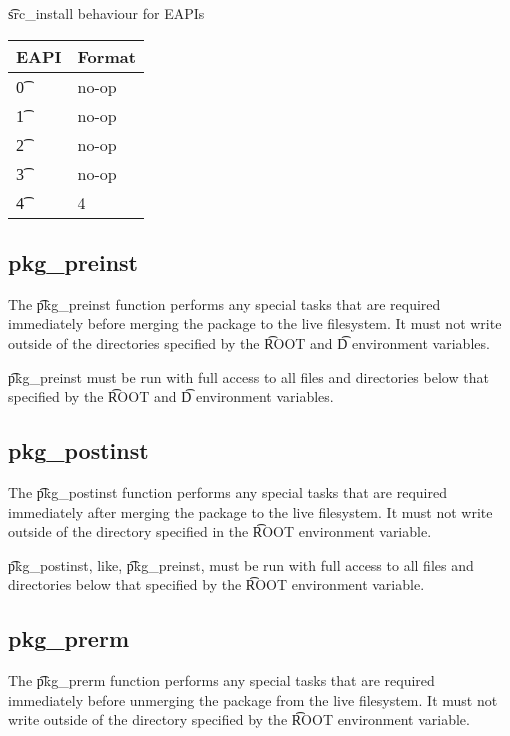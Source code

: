 \begin{centertable}{\t{src\_install} behaviour for EAPIs} \label{tab:src-install-table}
    \begin{tabular}{ l l }
        \toprule
        \multicolumn{1}{c}{\textbf{EAPI}} &
        \multicolumn{1}{c}{\textbf{Format}} \\
        \midrule
    \t{0} & no-op \\
    \t{1} & no-op \\
    \t{2} & no-op \\
    \t{3} & no-op \\
    \t{4} & 4 \\
    \bottomrule
    \end{tabular}
\end{centertable}

\subsection{pkg\_preinst}
\label{sec:pkg-preinst-function}

The \t{pkg\_preinst} function performs any special tasks that are required immediately before
merging the package to the live filesystem. It must not write outside of the directories specified
by the \t{ROOT} and \t{D} environment variables.

\t{pkg\_preinst} must be run with full access to all files and directories below that specified by
the \t{ROOT} and \t{D} environment variables.

\subsection{pkg\_postinst}
\label{sec:pkg-postinst-function}

The \t{pkg\_postinst} function performs any special tasks that are required immediately after
merging the package to the live filesystem. It must not write outside of the directory specified
in the \t{ROOT} environment variable.

\t{pkg\_postinst}, like, \t{pkg\_preinst}, must be run with full access to all files and directories
below that specified by the \t{ROOT} environment variable.

\subsection{pkg\_prerm}
\label{sec:pkg-prerm-function}

The \t{pkg\_prerm} function performs any special tasks that are required immediately before
unmerging the package from the live filesystem. It must not write outside of the directory specified
by the \t{ROOT} environment variable.

